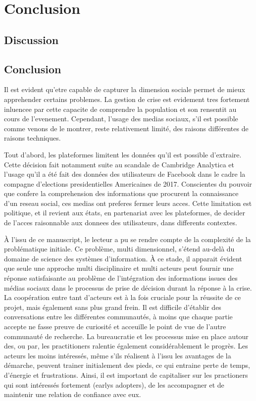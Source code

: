 \chapter*{Conclusion}

\section{Discussion}


\section{Conclusion}
Il est evident qu'etre capable de capturer la dimension sociale permet de mieux apprehender certains problemes.
La gestion de crise est evidement tres fortement inluencee par cette capacite de comprendre la population et son rensentit au cours de l'evenement.
Cependant, l'usage des medias sociaux, s'il est possible comme venons de le montrer, reste relativement limité, des raisons différentes de raisons techniques.

Tout d'abord, les plateformes limitent les données qu'il est possible d'extraire.
Cette décision fait notamment suite au scandale de Cambridge Analytica et l'usage qu'il a été fait des données des utilisateurs de Facebook dans le cadre la compagne d'elections presidentielles Americaines de 2017.
Conscientes du pouvoir que confere la comprehension des informations que procurent la connaissance d'un reseau social, ces medias ont preferes fermer leurs acces.
Cette limitation est politique, et il revient aux états, en partenariat avec les plateformes, de decider de l'acces raisonnable aux donnees des utilisateurs, dans differents contextes.

À l'issu de ce manuscript, le lecteur a pu se rendre compte de la complexité de la problématique initiale.
Ce problème, multi dimensionnel, s'étend au-delà du domaine de science des systèmes d'information.
À ce stade, il apparait évident que seule une approche multi disciplinaire et multi acteurs peut
fournir une réponse satisfaisante au problème de l'intégration des informations issues des
médias sociaux dans le processus de prise de décision durant la réponse à la crise.
La coopération entre tant d'acteurs est à la fois cruciale pour la réussite de ce projet,
mais également sans plus grand frein.
Il est difficile d'établir des conversations entre les différentes communautés, à moins
que chaque partie accepte ne fasse preuve de curiosité et acceuille le point de vue de
l'autre communauté de recherche.
La bureaucratie et les processus mise en place autour des, ou par, les practitioners
ralentie également considérablement le progrès.
Les acteurs les moins intéressés, même s'ils réalisent à l'issu les avantages de la démarche,
peuvent trainer initialement des pieds, ce qui entraine perte de temps, d'énergie et frustrations.
Ainsi, il est important de capitaliser sur les practioners qui sont intéressés fortement
(earlys adopters), de les accompagner et de maintenir une relation de confiance avec eux.


